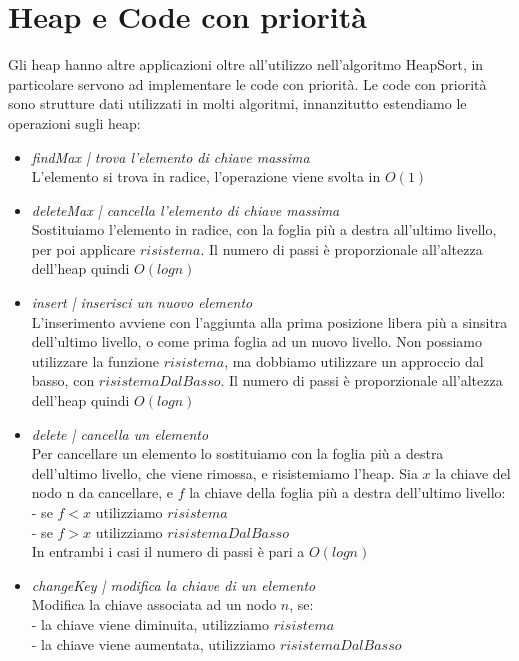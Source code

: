 \documentclass[11pt, oneside]{article}   	%
\begin{document}
\section*{Heap e Code con priorità}
Gli heap hanno altre applicazioni oltre all'utilizzo nell'algoritmo HeapSort, in particolare servono ad implementare le code con priorità. Le code con priorità sono strutture dati utilizzati in molti algoritmi, innanzitutto estendiamo le operazioni sugli heap:
\begin{itemize}
\item \emph{findMax | trova l'elemento di chiave massima}\\
L'elemento si trova in radice, l'operazione viene svolta in $O(1)$
\item \emph{deleteMax | cancella l'elemento di chiave massima}\\
Sostituiamo l'elemento in radice, con la foglia più a destra all'ultimo livello, per poi applicare $risistema$. Il numero di passi è proporzionale all'altezza dell'heap quindi $O(logn)$
\item \emph{insert | inserisci un nuovo elemento}\\
L'inserimento avviene con l'aggiunta alla prima posizione libera più a sinsitra dell'ultimo livello, o come prima foglia ad un nuovo livello. Non possiamo utilizzare la funzione $risistema$, ma dobbiamo utilizzare un approccio dal basso, con $risistemaDalBasso$. Il numero di passi è proporzionale all'altezza dell'heap quindi $O(logn)$
\item \emph{delete | cancella un elemento}\\
Per cancellare un elemento lo sostituiamo con la foglia più a destra dell'ultimo livello, che viene rimossa, e risistemiamo l'heap. Sia $x$ la chiave del nodo n da cancellare, e $f$ la chiave della foglia più a destra dell'ultimo livello:\\
- se $f < x$ utilizziamo $risistema$\\
- se $f > x$ utilizziamo $risistemaDalBasso$\\
In entrambi i casi il numero di passi è pari a $O(logn)$
\item \emph{changeKey | modifica la chiave di un elemento}\\
Modifica la chiave associata ad un nodo $n$, se:\\
- la chiave viene diminuita, utilizziamo $risistema$\\
- la chiave viene aumentata, utilizziamo $risistemaDalBasso$
\end{itemize} 
\end{document}
